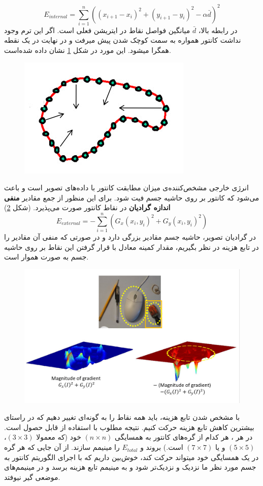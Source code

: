 \documentclass[a4paper]{article}
\begin{document}
\begin{equation*}
E_{internal}=\sum_{i=1}^{n}\left(\left(x_{i+1}-x_i\right)^2+\left(y_{i+1}-y_i\right)^2-\alpha\bar{d}\right)^2
\end{equation*}
در رابطه بالا، $ \bar{d} $ میانگین فواصل نقاط در ایتریشن فعلی است. اگر این ترم وجود نداشت کانتور همواره به سمت کوچک شدن پیش میرفت و در نهایت در یک نقطه همگرا میشود. این مورد در شکل 
\ref{3}
نشان داده شده‌است.
\begin{figure}[H]
	\centering
	\includegraphics[width=.25\linewidth]{q3-2}
	\caption{}
	\label{3}
\end{figure}
انرژی خارجی مشخص‌کننده‌ی میزان مطابقت کانتور با داده‌های تصویر است و باعث می‌شود که کانتور بر روی حاشیه جسم فیت شود. برای این منظور از جمع مقادیر
 \textbf{منفی اندازه گرادیان} 
در نقاط کانتور صورت می‌پذیرد. (شکل 
\ref{4})
\begin{equation*}
	E_{external}= - \sum_{i=1}^{n} (G_{x}(x_{i},y_{i})^{2} + G_{y}(x_{i},y_{i})^{2})
\end{equation*}
در گرادیان تصویر، حاشیه جسم مقادیر بزرگی دارد و در صورتی که منفی آن مقادیر را در تابع هزینه در نظر بگیریم، مقدار کمینه معادل با قرار گرفتن این نقاط بر روی حاشیه جسم به صورت هموار است. 
\begin{figure}[H]
	\centering
	\includegraphics[width=.6\linewidth]{q3-3}
	\caption{}
	\label{4}
\end{figure}
با مشخص شدن تابع هزینه، باید همه نقاط را به گونه‌ای تغییر دهیم که در راستای بیشترین کاهش تابع هزینه حرکت کنیم.  نتیجه مطلوب با استفاده از
قابل حصول است. 
در هر 
،
 هر کدام از گره‌های کانتور به همسایگی 
$ (n \times n) $
خود (که معمولا
 $ (3 \times 3) $،
 $ (5 \times 5) $
 و یا 
 $ (7 \times 7) $
 است.) بروند و $ E_{total} $ را مینیمم سازند. از آن جایی که هر گره در یک همسایگی خود میتواند حرکت کند، خوش‌بین داریم که با اجرای الگوریتم کانتور به جسم مورد نظر ما نزدیک و نزدیک‌تر شود و به مینیمم تابع هزینه برسد و در مینیمم‌های موضعی گیر نیوفتد. 
\end{document}
